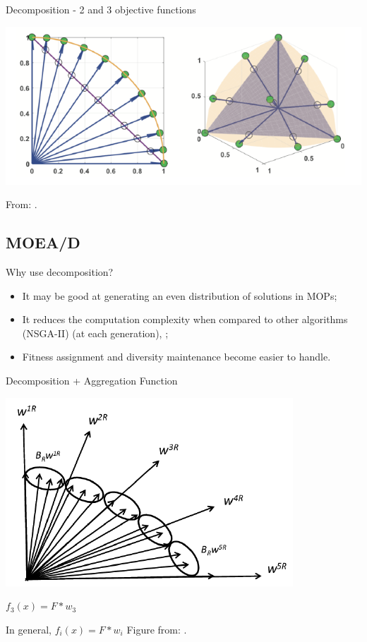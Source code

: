 \documentclass[ignorenonframetext,]{beamer}
\providecommand{\tightlist}{%
  \setlength{\itemsep}{0pt}\setlength{\parskip}{0pt}}
\begin{document}
\begin{frame}{Decomposition - 2 and 3 objective functions}

\centering
\includegraphics{cellular_moead_files/figure-beamer/unnamed-chunk-3-1.pdf}

\tiny From: \citet{chugh2017handling}.

\end{frame}

\subsection{MOEA/D}\label{moead-2}

\begin{frame}{Why use decomposition?}

\begin{itemize}
\tightlist
\item
  It may be good at generating an even distribution of solutions in
  MOPs;
\item
  It reduces the computation complexity when compared to other
  algorithms (NSGA-II) (at each generation),
  \citet{zhang2009performance}; 
\item
  Fitness assignment and diversity maintenance become easier to handle.
\end{itemize}

\end{frame}

\begin{frame}{Decomposition + Aggregation Function}

\centering
\includegraphics{cellular_moead_files/figure-beamer/unnamed-chunk-4-1.pdf}
\raggedright \tiny  \centering
\(f_{3}(x) = F * w_{3}\)

In general, \(f_{i}(x) = F * w_{i}\) Figure from:
\citet{chugh2017handling}.

\end{frame}
\end{document}
